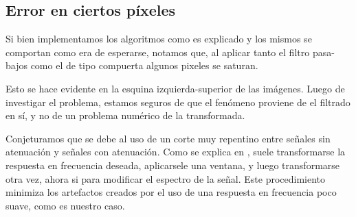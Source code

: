 

\subsection{Error en ciertos p\'ixeles}

Si bien implementamos los algoritmos como es explicado y los mismos
se comportan como era de esperarse, notamos que, al aplicar tanto el
filtro pasa-bajos como el de tipo compuerta algunos pixeles se saturan.

Esto se hace evidente en la esquina izquierda-superior de las im\'agenes.
Luego de investigar el problema, estamos seguros de que el fen\'omeno
proviene de el filtrado en s\'i, y no de un problema num\'erico de la
transformada.

Conjeturamos que se debe al uso de un corte muy repentino entre
se\~nales sin atenuaci\'on y se\~nales con atenuaci\'on.
Como se explica en \cite[Window Method for FIR Filter Design]{stanford},
suele transformarse la respuesta en frecuencia deseada, aplicarsele
una ventana, y luego transformarse otra vez, ahora si para modificar
el espectro de la se\~nal. Este procedimiento minimiza los artefactos
creados por el uso de una respuesta en frecuencia poco suave, como es
nuestro caso.
